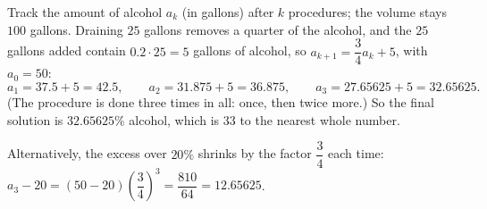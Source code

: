 Track the amount of alcohol $a_k$ (in gallons) after $k$ procedures; the volume stays $100$ gallons. Draining $25$ gallons removes a quarter of the alcohol, and the $25$ gallons added contain $0.2\cdot25=5$ gallons of alcohol, so $a_{k+1}=\dfrac{3}{4}a_k+5$, with $a_0=50$:
\[
a_1=37.5+5=42.5,\qquad a_2=31.875+5=36.875,\qquad a_3=27.65625+5=32.65625 .
\]
(The procedure is done three times in all: once, then twice more.) So the final solution is $32.65625\%$ alcohol, which is $\boxed{33}$ to the nearest whole number.

Alternatively, the excess over $20\%$ shrinks by the factor $\dfrac{3}{4}$ each time: $a_3-20=(50-20)\left(\dfrac{3}{4}\right)^3=\dfrac{810}{64}=12.65625$.
